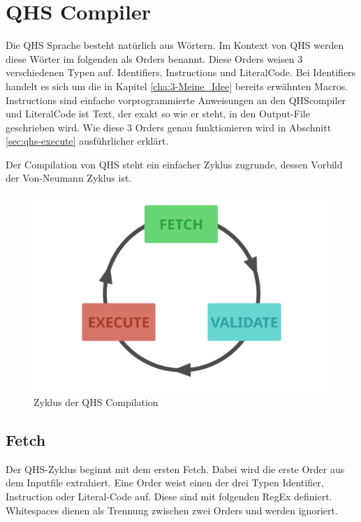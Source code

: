 \chapter{QHS Compiler} \label{cha:4-QHS_Compiler}
Die QHS Sprache besteht natürlich aus Wörtern. Im Kontext von QHS werden diese Wörter im folgenden als Orders benannt. Diese Orders weisen 3 verschiedenen Typen auf. Identifiers, Instructions und LiteralCode.
Bei Identifiers handelt es sich um die in Kapitel \ref{cha:3-Meine_Idee} bereits erwähnten Macros. Instructions sind einfache vorprogrammierte Anweisungen an den QHScompiler und LiteralCode ist Text, der exakt so wie er steht,
in den Output-File geschrieben wird. Wie diese 3 Orders genau funktionieren wird in Abschnitt \ref{sec:qhs-execute} ausführlicher erklärt.

Der Compilation von QHS steht ein einfacher Zyklus zugrunde, dessen Vorbild der Von-Neumann Zyklus ist.

\begin{figure}[h!]
    \centering
    \includegraphics[scale=0.6]{resources/images/qhs-cycle.png}
    \caption{Zyklus der QHS Compilation}
    \label{fig:qhs-cycle}
\end{figure}

\section{Fetch} \label{sec:qhs-fetch}
Der QHS-Zyklus beginnt mit dem ersten Fetch. Dabei wird die erste Order aus dem Inputfile extrahiert. Eine Order weist einen der drei Typen Identifier, Instruction oder Literal-Code auf. Diese sind mit folgenden RegEx definiert.
Whitespaces dienen als Trennung zwischen zwei Orders und werden ignoriert.

